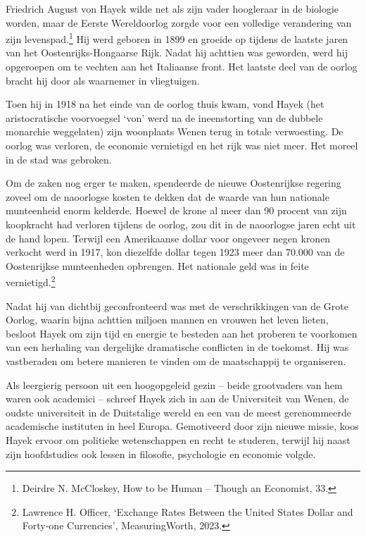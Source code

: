 \documentclass[
  a5paper,
  smalldemyvopaper,11pt,twoside,onecolumn,openright,extrafontsizes]{memoir}
\begin{document}
Friedrich August von Hayek wilde net als zijn vader hoogleraar in de
biologie worden, maar de Eerste Wereldoorlog zorgde voor een volledige
verandering van zijn levenspad.\footnote{\hspace{0pt}Deirdre N.
  McCloskey, How to be Human -- Though an Economist, 33.} Hij werd
geboren in 1899 en groeide op tijdens de laatste jaren van het
Oostenrijks-Hongaarse Rijk. Nadat hij achttien was geworden, werd hij
opgeroepen om te vechten aan het Italiaanse front. Het laatste deel van
de oorlog bracht hij door als waarnemer in vliegtuigen.

Toen hij in 1918 na het einde van de oorlog thuis kwam, vond Hayek (het
aristocratische voorvoegsel `von' werd na de ineenstorting van de
dubbele monarchie weggelaten) zijn woonplaats Wenen terug in totale
verwoesting. De oorlog was verloren, de economie vernietigd en het rijk
was niet meer. Het moreel in de stad was gebroken.

Om de zaken nog erger te maken, spendeerde de nieuwe Oostenrijkse
regering zoveel om de naoorlogse kosten te dekken dat de waarde van hun
nationale munteenheid enorm kelderde. Hoewel de krone al meer dan 90
procent van zijn koopkracht had verloren tijdens de oorlog, zou dit in
de naoorlogse jaren echt uit de hand lopen. Terwijl een Amerikaanse
dollar voor ongeveer negen kronen verkocht werd in 1917, kon diezelfde
dollar tegen 1923 meer dan 70.000 van de Oostenrijkse munteenheden
opbrengen. Het nationale geld was in feite vernietigd.\footnote{\hspace{0pt}Lawrence
  H. Officer, `Exchange Rates Between the United States Dollar and
  Forty-one Currencies', MeasuringWorth, 2023.}

Nadat hij van dichtbij geconfronteerd was met de verschrikkingen van de
Grote Oorlog, waarin bijna achttien miljoen mannen en vrouwen het leven
lieten, besloot Hayek om zijn tijd en energie te besteden aan het
proberen te voorkomen van een herhaling van dergelijke dramatische
conflicten in de toekomst. Hij was vastberaden om betere manieren te
vinden om de maatschappij te organiseren.

Als leergierig persoon uit een hoogopgeleid gezin -- beide grootvaders
van hem waren ook academici -- schreef Hayek zich in aan de Universiteit
van Wenen, de oudste universiteit in de Duitstalige wereld en een van de
meest gerenommeerde academische instituten in heel Europa. Gemotiveerd
door zijn nieuwe missie, koos Hayek ervoor om politieke wetenschappen en
recht te studeren, terwijl hij naast zijn hoofdstudies ook lessen in
filosofie, psychologie en economie volgde.
\end{document}
